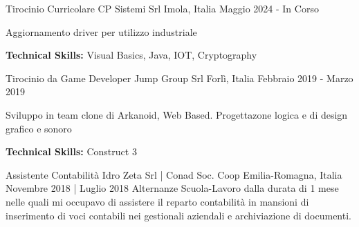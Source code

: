 

\begin{cventries}

    \cventry
    {Tirocinio Curricolare} %
    {CP Sistemi Srl} %
    {Imola, Italia} %
    {Maggio 2024 - In Corso} %
    {
      \begin{cvitems} %
        \item {Aggiornamento driver per utilizzo industriale}
        \item {\textbf{Technical Skills:} Visual Basics, Java, IOT, Cryptography}
      \end{cvitems}
    }

    \cventry
    {Tirocinio da Game Developer} %
    {Jump Group Srl} %
    {Forlì, Italia} %
    {Febbraio 2019 - Marzo 2019} %
    {
      \begin{cvitems} %
        \item {Sviluppo in team clone di Arkanoid, Web Based. Progettazone logica e di design grafico e sonoro}
        \item {\textbf{Technical Skills:} Construct 3}
      \end{cvitems}
    }

    \cventry
    {Assistente Contabilità} %
    {Idro Zeta Srl | Conad Soc. Coop} %
    {Emilia-Romagna, Italia} %
    {Novembre 2018 | Luglio 2018} %
    {Alternanze Scuola-Lavoro dalla durata di 1 mese nelle quali mi occupavo di assistere il reparto contabilità in mansioni di inserimento di voci contabili nei gestionali aziendali e archiviazione di documenti.}

\end{cventries}
